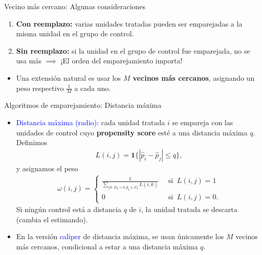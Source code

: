 \documentclass[10pt, xcolor=dvipsnames]{beamer}
\begin{document}
\begin{frame}{Vecino más cercano: Algunas consideraciones}
\begin{enumerate}
    \item \textbf{Con reemplazo:} varias unidades tratadas pueden ser emparejadas a la misma unidad en el grupo de control.
    \smallspace
    \item \textbf{Sin reemplazo:} si la unidad en el grupo de control fue emparejada, no se usa más $\implies$ ¡El orden del emparejamiento importa!
\end{enumerate} 
\begin{itemize}
    \item Una extensión natural es usar los \textbf{$M$ vecinos más cercanos}, asignando un peso respectivo $\frac{1}{M}$ a cada uno. 
\end{itemize}
\end{frame}


\begin{frame}{Algoritmos de emparejamiento: Distancia máxima}
\begin{itemize}
    \item \textcolor{blue}{Distancia máxima (radio):} cada unidad tratada $i$ se empareja con las unidades de control cuyo \textbf{propensity score} esté a una distancia máxima $q$. Definimos
    \begin{align*}
    L(i,j)=\mathbf{1}\{|\hat{p}_i-\hat{p}_j| \leq q\},
    \end{align*}
    y asignamos el peso 
    \begin{align*}
        \omega(i,j) = 
        \begin{cases}
            \frac{1}{\sum_{\{ k: D_k = 0, \hat{p}_k \in \mathcal{S} \} } L(i,k)} \;\; &\text{si} \;\; L(i,j) = 1 \\
            0 \;\; &\text{si} \;\; L(i,j) = 0.
        \end{cases}
    \end{align*}
    Si ningún control está a distancia \(q\) de \(i\), la unidad tratada se descarta (cambia el estimando).
    \item En la versión \textcolor{blue}{caliper} de distancia máxima, se usan únicamente los $M$ vecinos más cercanos, condicional a estar a una distancia máxima $q$.
\end{itemize}
\end{frame}
\end{document}
